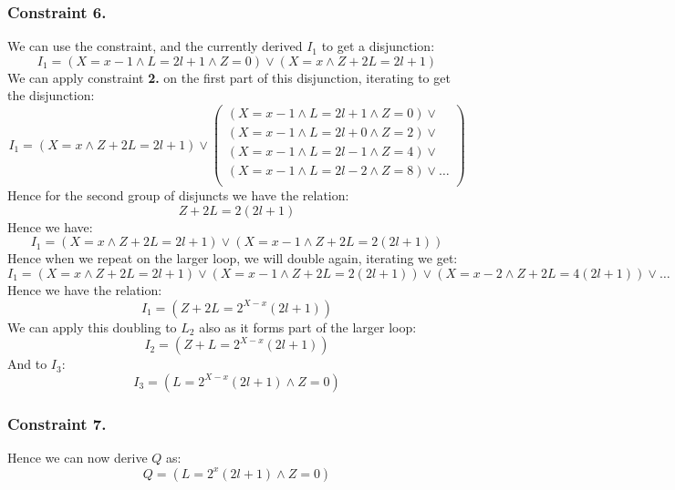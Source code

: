 \documentclass{report}
\begin{document}
\begin{itemize}
{                \subsubsection*{Constraint 6.}
                    We can use the constraint, and the currently derived $I_1$ to get a disjunction:
                    \[I_1 = (X=x-1 \land L = 2l + 1 \land Z = 0) \lor (X = x \land Z + 2L = 2l + 1)\]
                    We can apply constraint \textbf{2.} on the first part of this disjunction, iterating to get the disjunction:
                    \[I_1 = (X = x \land Z + 2L = 2l + 1) \lor \left( \begin{matrix}
                        (X=x-1 \land L = 2l + 1 \land Z = 0) \lor \\ 
                        (X=x-1 \land L = 2l + 0 \land Z = 2) \lor \\
                        (X=x-1 \land L = 2l-1 \land Z = 4) \lor \\
                        (X=x-1 \land L = 2l-2 \land Z = 8) \lor \dots \\
                    \end{matrix} \right)\]
                    Hence for the second group of disjuncts we have the relation:
                    \[Z + 2L = 2(2l + 1)\]
                    Hence we have:
                    \[I_1 = (X = x \land Z + 2L = 2l + 1) \lor (X=x-1 \land Z + 2L = 2(2l + 1))\]
                    Hence when we repeat on the larger loop, we will double again, iterating we get:
                    \[I_1 = (X = x \land Z + 2L = 2l + 1) \lor (X=x-1 \land Z + 2L = 2(2l + 1)) \lor (X=x-2 \land Z + 2L = 4(2l + 1)) \lor \dots\]
                    Hence we have the relation:
                    \[I_1 = (Z + 2L = 2^{X - x}(2l + 1))\]
                    We can apply this doubling to $L_2$ also as it forms part of the larger loop:
                    \[I_2 = (Z + L = 2^{X - x}(2l + 1))\]
                    And to $I_3$:
                    \[I_3 = (L = 2^{X-x}(2l + 1) \land Z = 0)\]

                \subsubsection*{Constraint 7.}
                    Hence we can now derive $Q$ as:
                    \[Q = (L = 2^x(2l + 1) \land Z = 0)\]
                
}
\end{itemize}
\end{document}
